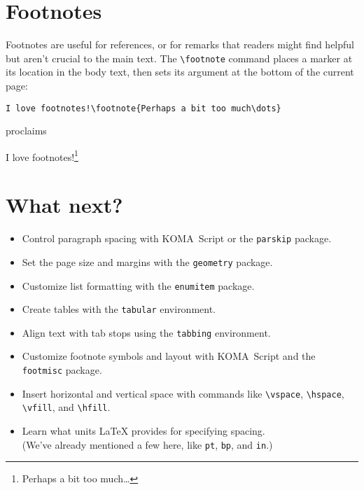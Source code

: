 \section{Footnotes}

Footnotes are useful for references,
or for remarks that readers might find helpful
but aren't crucial to the main text.
The \verb|\footnote| command places a marker at its location in the
body text, then sets its argument at the bottom of the current
page:
\begin{leftfigure}
\begin{lstlisting}
I love footnotes!\footnote{Perhaps a bit too much\dots}
\end{lstlisting}
\end{leftfigure}
proclaims
\begin{leftfigure}
\lm%
I love footnotes!\footnote{Perhaps a bit too much\dots}
\end{leftfigure}

\section{What next?}
\begin{itemize}
\item Control paragraph spacing with KOMA~Script or the \texttt{parskip} package.
\item Set the page size and margins with the \texttt{geometry} package.
\item Customize list formatting with the \texttt{enumitem} package.
\item Create tables with the \texttt{tabular} environment.
\item Align text with tab stops using the \texttt{tabbing} environment.
\item Customize footnote symbols and layout with KOMA~Script and the
    \texttt{footmisc} package.
\item Insert horizontal and vertical space with commands like
    \verb|\vspace|, \verb|\hspace|, \verb|\vfill|, and \verb|\hfill|.
\item Learn what units \LaTeX{} provides for specifying spacing. \\
    (We've already mentioned a few here, like
    \texttt{pt}, \texttt{bp}, and \texttt{in}.)
\end{itemize}
